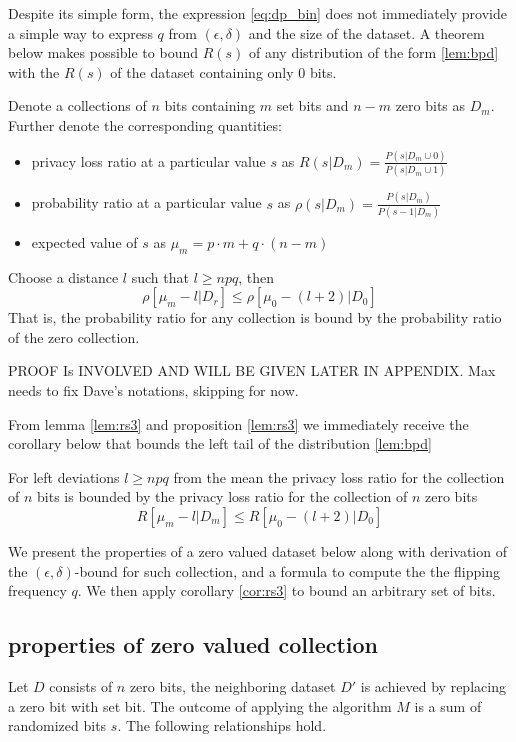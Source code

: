 \documentclass[11pt]{article}
\begin{document}
Despite its simple form, the expression \ref{eq:dp_bin} does not immediately provide a simple way to express $q$ from  $(\epsilon,\delta)$ and the size of the dataset.  A theorem below makes possible to bound $R(s)$ of any distribution of the form  \ref{lem:bpd} with the $R(s)$ of the dataset containing only 0 bits.

\begin{prop} \label{lem:rs3}
Denote a collections of $n$ bits containing $m$ set bits and $n-m$ zero bits as $D_m$. Further denote the corresponding quantities:
\begin{itemize}
\item privacy loss ratio at a particular value $s$ as $R(s|D_m) = \frac{P(s|D_m \cup 0)}{P(s | D_m \cup 1)}$
\item probability ratio at a particular value $s$ as $\rho(s|D_m) = \frac{P(s|D_m)}{P(s-1|D_m)}$
\item expected value of $s$ as $\mu_m = p \cdot m + q \cdot (n-m )$
\end{itemize}
Choose a distance $l$ such that $l \ge npq$, then 
\[ \rho[\mu_m - l|D_r] \le \rho[\mu_0 - (l+2)|D_0] \]
That is, the probability ratio for any collection is bound by the probability ratio of the zero collection. \begin{pf}
PROOF Is INVOLVED AND WILL BE GIVEN LATER IN APPENDIX.  Max needs to fix Dave's notations, skipping for now.
\end{pf}
\end{prop}

From lemma \eqref{lem:rs3} and proposition \ref{lem:rs3} we immediately receive the corollary below that bounds the left tail of the distribution \ref{lem:bpd}
\begin{cor}\label{cor:rs3}
For left deviations $l \ge npq$ from the mean the privacy loss ratio for the collection of $n$ bits is bounded by the privacy loss ratio for the collection of $n$ zero bits
\[ R[\mu_m- l|D_m] \le R[\mu_0 - (l+2)|D_0] \]
\end{cor}


We present the properties of a zero valued dataset below along with derivation of the $(\epsilon,\delta)$-bound for such collection, and a formula  to compute the the flipping frequency $q$. We then apply corollary \ref{cor:rs3} to bound an arbitrary set of bits. 

\subsection{properties of zero valued collection}
Let $D$ consists of $n$ zero bits, the neighboring dataset $D'$ is achieved by replacing a zero bit with set bit. The outcome of applying the algorithm $M$ is a sum of randomized bits $s$. The following relationships hold.
\end{document}
